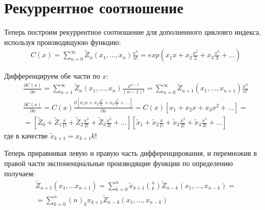 \section{Рекуррентное соотношение}

Теперь построим рекуррентное соотношение для дополненного цикловго индекса, используя производящуюю функцию:
\[
	\begin{split}
		& C\left(x\right) = \sum_{n=0}^{\infty} \tilde Z_n\left(x_1, ..., x_n\right) \frac{x^n}{n!} = exp\left(x_1x + x_2 \frac{x^2}{2} + x_3 \frac{x^3}{3} + ...\right)
	\end{split}
\]

Дифференцируем обе части по $x$:
\[
	\begin{split}
		&\frac{\partial C\left(x\right)}{\partial x} = \sum_{n=1}^{\infty} \tilde Z_n \left(x_1, ..., x_n\right) \frac{x^{n-1}}{\left(n-1\right)!} = \sum_{n=0}^{\infty} \tilde Z_{n+1} \left(x_1, ..., x_{n+1}\right) \frac{x^n}{n!}\\
		&\frac{\partial C\left(x\right)}{\partial x} = C\left(x\right)\frac{\partial \left[x_1x + x_2\frac{x^2}{2} + x_3 \frac{x^3}{3} + ...\right]}{\partial x} = C\left(x\right) \left[x_1 + x_2 x + x_3 x^2 + ...\right] = \\
		& = \left[\tilde Z_0 + \tilde Z_1 \frac{x}{1!} + \tilde Z_2 \frac{x^2}{2!} + \tilde Z_3 \frac{x^3}{3!} + ...\right]\left[\tilde x_1 + \tilde x_2 \frac{x}{1!} + \tilde x_3 \frac{x^2}{2!} + \tilde x_4 \frac{x^3}{3!} + ...\right]
	\end{split}
\]
где в качестве $\tilde x_{k+1} = x_{k+1} k!$

Теперь приравнивая левую и правую часть дифференцирования, и перемножив в правой части экспоненциальные производящие функции по определению получаем:
\[
	\begin{split}
		&\tilde Z_{n+1} \left(x_1, ... x_{n+1}\right) = \sum_{k=0}^n \tilde x_{k+1} \binom{n}{k} \tilde Z_{n-k}\left(x_1, ..., x_{n-k}\right) =\\
		&= \sum_{k=0}^n \left(n\right)_k x_{k+1} \tilde Z_{n-k} \left(x_1, ..., x_{n-k}\right)
	\end{split}
\]